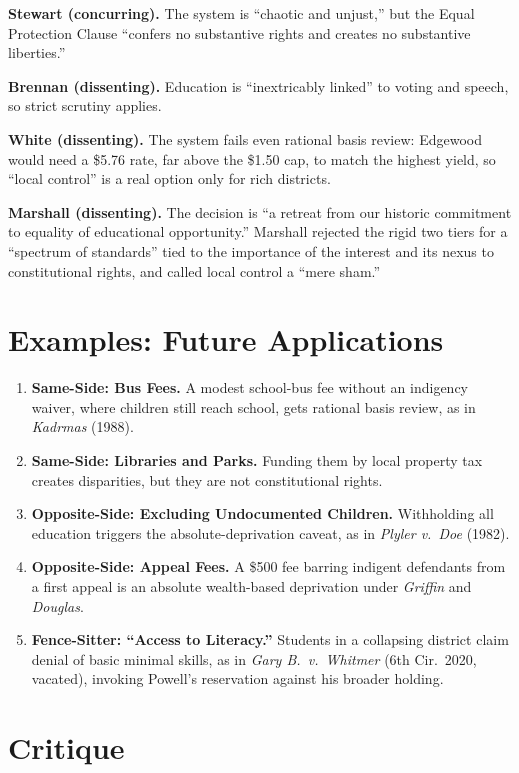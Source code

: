 \documentclass[12pt]{article}
\begin{document}
\textbf{Stewart (concurring).} The system is ``chaotic and unjust,'' but the Equal Protection Clause ``confers no substantive rights and creates no substantive liberties.''

\textbf{Brennan (dissenting).} Education is ``inextricably linked'' to voting and speech, so strict scrutiny applies.

\textbf{White (dissenting).} The system fails even rational basis review: Edgewood would need a \$5.76 rate, far above the \$1.50 cap, to match the highest yield, so ``local control'' is a real option only for rich districts.

\textbf{Marshall (dissenting).} The decision is ``a retreat from our historic commitment to equality of educational opportunity.'' Marshall rejected the rigid two tiers for a ``spectrum of standards'' tied to the importance of the interest and its nexus to constitutional rights, and called local control a ``mere sham.''

\section{Examples: Future Applications}

\begin{enumerate}
\item \textbf{Same-Side: Bus Fees.} A modest school-bus fee without an indigency waiver, where children still reach school, gets rational basis review, as in \textit{Kadrmas} (1988).
\item \textbf{Same-Side: Libraries and Parks.} Funding them by local property tax creates disparities, but they are not constitutional rights.
\item \textbf{Opposite-Side: Excluding Undocumented Children.} Withholding all education triggers the absolute-deprivation caveat, as in \textit{Plyler v.\ Doe} (1982).
\item \textbf{Opposite-Side: Appeal Fees.} A \$500 fee barring indigent defendants from a first appeal is an absolute wealth-based deprivation under \textit{Griffin} and \textit{Douglas}.
\item \textbf{Fence-Sitter: ``Access to Literacy.''} Students in a collapsing district claim denial of basic minimal skills, as in \textit{Gary B.\ v.\ Whitmer} (6th Cir.\ 2020, vacated), invoking Powell's reservation against his broader holding.
\end{enumerate}

\section{Critique}
\end{document}
